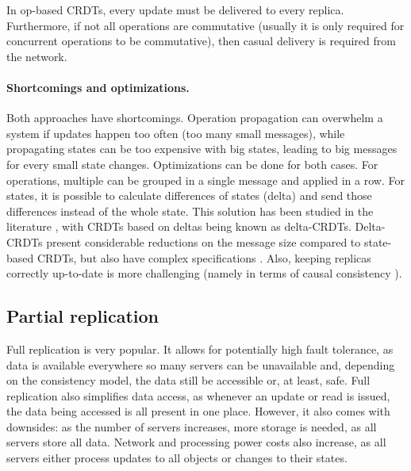 In op-based CRDTs, every update must be delivered to every replica.
Furthermore, if not all operations are commutative (usually it is only required for concurrent operations to be commutative), then casual delivery is required from the network.

\paragraph{Shortcomings and optimizations.}
Both approaches have shortcomings.
Operation propagation can overwhelm a system if updates happen too often (too many small messages), while propagating states can be too expensive with big states, leading to big messages for every small state changes.
Optimizations can be done for both cases.
For operations, multiple can be grouped in a single message and applied in a row.
For states, it is possible to calculate differences of states (delta) and send those differences instead of the whole state.
This solution has been studied in the literature \cite{deltaAlmeida, deltaVan}, with CRDTs based on deltas being known as delta-CRDTs. Delta-CRDTs present considerable reductions on the message size compared to state-based CRDTs, but also have complex specifications \cite{deltaAlmeida}. Also, keeping replicas correctly up-to-date is more challenging (namely in terms of causal consistency \cite{deltaAlmeida}).

\subsection{Partial replication}

Full replication is very popular. It allows for potentially high fault tolerance, as data is available everywhere so many servers can be  unavailable and, depending on the consistency model, the data still be accessible or, at least, safe.
Full replication also simplifies data access, as whenever an update or read is issued, the data being accessed is all present in one place.
However, it also comes with downsides: as the number of servers increases, more storage is needed, as all servers store all data.
Network and processing power costs also increase, as all servers either process updates to all objects or changes to their states.

